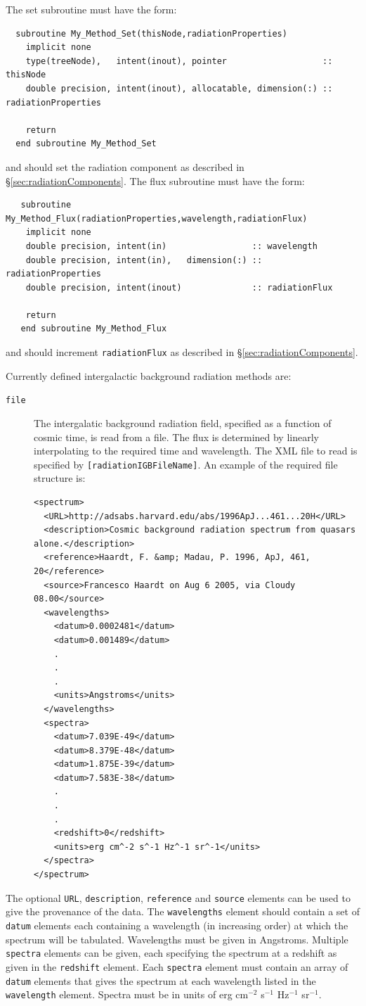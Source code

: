 The set subroutine must have the form:
\begin{verbatim}
  subroutine My_Method_Set(thisNode,radiationProperties)
    implicit none
    type(treeNode),   intent(inout), pointer                   :: thisNode
    double precision, intent(inout), allocatable, dimension(:) :: radiationProperties

    return
  end subroutine My_Method_Set
\end{verbatim}
and should set the radiation component as described in \S\ref{sec:radiationComponents}. The flux subroutine must have the form:
\begin{verbatim}
   subroutine My_Method_Flux(radiationProperties,wavelength,radiationFlux)
    implicit none
    double precision, intent(in)                 :: wavelength
    double precision, intent(in),   dimension(:) :: radiationProperties
    double precision, intent(inout)              :: radiationFlux

    return
   end subroutine My_Method_Flux
\end{verbatim}
and should increment {\tt radiationFlux} as described in \S\ref{sec:radiationComponents}.

Currently defined intergalactic background radiation methods are:
\begin{description}
 \item [{\tt file}] The intergalatic background radiation field, specified as a function of cosmic time, is read from a file. The flux is determined by linearly interpolating to the required time and wavelength. The XML file to read is specified by {\tt [radiationIGBFileName]}. An example of the required file structure is:
 \begin{verbatim}
<spectrum>
  <URL>http://adsabs.harvard.edu/abs/1996ApJ...461...20H</URL>
  <description>Cosmic background radiation spectrum from quasars alone.</description>
  <reference>Haardt, F. &amp; Madau, P. 1996, ApJ, 461, 20</reference>
  <source>Francesco Haardt on Aug 6 2005, via Cloudy 08.00</source>
  <wavelengths>
    <datum>0.0002481</datum>
    <datum>0.001489</datum>
    .
    .
    .
    <units>Angstroms</units>
  </wavelengths>
  <spectra>
    <datum>7.039E-49</datum>
    <datum>8.379E-48</datum>
    <datum>1.875E-39</datum>
    <datum>7.583E-38</datum>
    .
    .
    .
    <redshift>0</redshift>
    <units>erg cm^-2 s^-1 Hz^-1 sr^-1</units>
  </spectra>
</spectrum>
 \end{verbatim}
\end{description}
The optional {\tt URL}, {\tt description}, {\tt reference} and {\tt source} elements can be used to give the provenance of the data. The {\tt wavelengths} element should contain a set of {\tt datum} elements each containing a wavelength (in increasing order) at which the spectrum will be tabulated. Wavelengths must be given in Angstroms. Multiple {\tt spectra} elements can be given, each specifying the spectrum at a redshift as given in the {\tt redshift} element. Each {\tt spectra} element must contain an array of {\tt datum} elements that gives the spectrum at each wavelength listed in the {\tt wavelength} element. Spectra must be in units of erg cm$^{-2}$ s$^{-1}$ Hz$^{-1}$ sr$^{-1}$.

